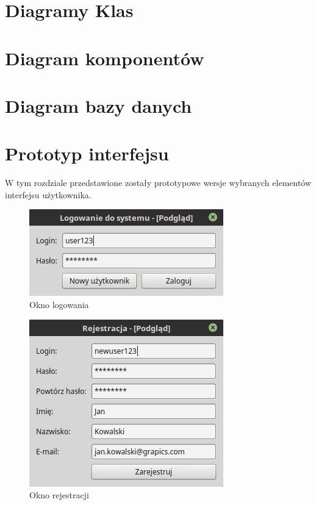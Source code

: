 \documentclass[12pt, oneside, final]{report}
\begin{document}
\chapter{Diagramy Klas}


\chapter{Diagram komponentów}


\chapter{Diagram bazy danych}


\chapter{Prototyp interfejsu}
W tym rozdziale przedstawione zostały prototypowe wersje wybranych elementów interfejsu użytkownika.
\newcommand{\uiscale}{0.6}
\begin{figure}[ht!]
	\centering
	\includegraphics[scale=\uiscale]{ui/login.png}
	\caption{Okno logowania}
\end{figure}
\begin{figure}[ht!]
	\centering
	\includegraphics[scale=\uiscale]{ui/register.png}
	\caption{Okno rejestracji}
\end{figure}
\end{document}

